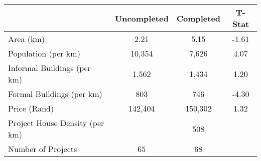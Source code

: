 \begin{tabular}{l*{1}{ccc}}
 &Uncompleted &Completed &T-Stat  \\
\hline 
Area (km) &       2.21 &       5.15 &      -1.61  \\
Population (per km) &     10,354 &      7,626 &       4.07  \\
Informal Buildings (per km) &      1,562 &      1,434 &       1.20  \\
Formal Buildings (per km) &        803 &        746 &      -4.30  \\
Price (Rand) &    142,404 &    150,302 &       1.32  \\
Project House Density (per km) &  &        508 &   \\
Number of Projects &         65 &         68 &   \\
\hline
\end{tabular}